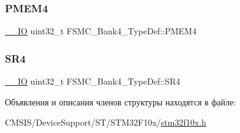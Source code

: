 \subsubsection{\texorpdfstring{PMEM4}{PMEM4}}
{\footnotesize\ttfamily \mbox{\hyperlink{group___c_m_s_i_s___c_m3__core__definitions_gaec43007d9998a0a0e01faede4133d6be}{\+\_\+\+\_\+\+IO}} uint32\+\_\+t F\+S\+M\+C\+\_\+\+Bank4\+\_\+\+Type\+Def\+::\+P\+M\+E\+M4}

\mbox{\label{struct_f_s_m_c___bank4___type_def_a1e0f09be7fa48bb7b14233866da1dd9f}} 
\subsubsection{\texorpdfstring{SR4}{SR4}}
{\footnotesize\ttfamily \mbox{\hyperlink{group___c_m_s_i_s___c_m3__core__definitions_gaec43007d9998a0a0e01faede4133d6be}{\+\_\+\+\_\+\+IO}} uint32\+\_\+t F\+S\+M\+C\+\_\+\+Bank4\+\_\+\+Type\+Def\+::\+S\+R4}



Объявления и описания членов структуры находятся в файле\+:\begin{DoxyCompactItemize}
\item 
C\+M\+S\+I\+S/\+Device\+Support/\+S\+T/\+S\+T\+M32\+F10x/\mbox{\hyperlink{stm32f10x_8h}{stm32f10x.\+h}}\end{DoxyCompactItemize}
